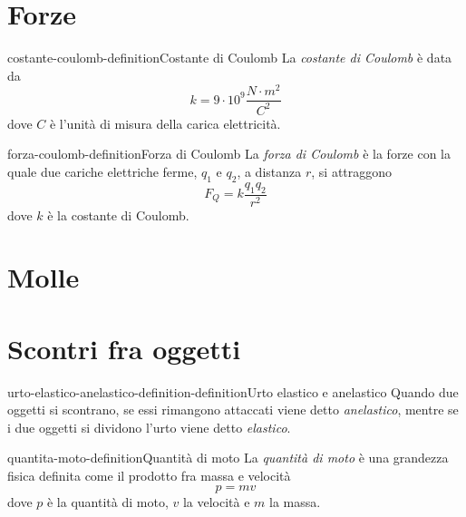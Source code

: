 \documentclass[preview]{standalone}
\begin{document}
\genpage

\section{Forze}

\begin{snippetdefinition}{costante-coulomb-definition}{Costante di Coulomb}
    La \textit{costante di Coulomb} è data da
    \[
        k = 9 \cdot 10^9 \frac{N \cdot m^2}{C^2} 
    \]
    dove \(C\) è l'unità di misura della carica elettricità.
\end{snippetdefinition}

\begin{snippetdefinition}{forza-coulomb-definition}{Forza di Coulomb}
    La \textit{forza di Coulomb} è la forze con la quale due cariche elettriche ferme,
    \(q_1\) e \(q_2\), a distanza \(r\), si attraggono
    \[
        F_Q = k \frac{q_1 q_2}{r^2}
    \]
    dove \(k\) è la costante di Coulomb.
\end{snippetdefinition}

\section{Molle}



\section{Scontri fra oggetti}

\begin{snippetdefinition}{urto-elastico-anelastico-definition-definition}{Urto elastico e anelastico}
    Quando due oggetti si scontrano, se essi rimangono
    attaccati viene detto \textit{anelastico}, mentre se i due oggetti
    si dividono l'urto viene detto \textit{elastico}.
\end{snippetdefinition}

\begin{snippetdefinition}{quantita-moto-definition}{Quantità di moto}
    La \textit{quantità di moto} è una grandezza fisica definita come il prodotto fra
    massa e velocità
    \[
        p = mv
    \]
    dove \(p\) è la quantità di moto, \(v\) la velocità e \(m\) la massa.
\end{snippetdefinition}
\end{document}
